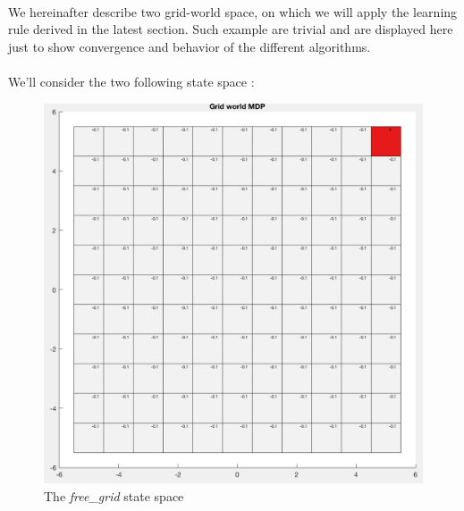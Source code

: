 \documentclass[a4paper]{report}
\begin{document}
{{			\paragraph{} We hereinafter describe two grid-world space, on which we will apply the learning rule derived in the latest section. Such example are trivial and are displayed here just to show convergence and behavior of the different algorithms. 
			
			\paragraph{} We'll consider the two following state space : 
			\begin{figure}[h!]
				\begin{minipage}{0.45\linewidth}
					\includegraphics[width=\linewidth]{free_grid}
					\caption{The \emph{free\_grid} state space}
				\end{minipage}
				\hfill
				\begin{minipage}{0.45\linewidth}

\end{minipage}
\end{figure}}}
\end{document}
